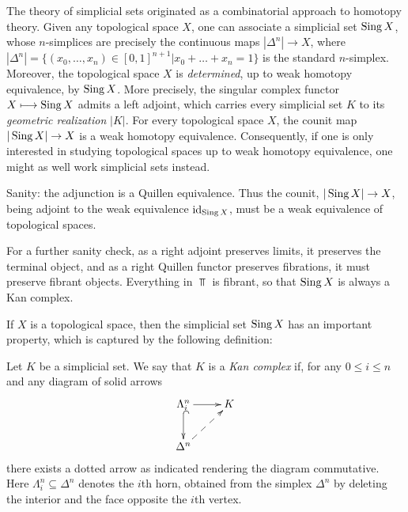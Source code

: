 The theory of simplicial sets originated as a combinatorial approach to homotopy theory. Given any topological space $X$, one can associate a simplicial set $\operatorname{Sing} X$, whose $n$-simplices are precisely the continuous maps $| \Delta^n | \rightarrow X$, where $|\Delta^n| = \{ (x_0, \ldots, x_n) \in [0,1]^{n+1} | x_0 + \ldots + x_n =1 \}$ is the standard $n$-simplex. Moreover, the topological space $X$ is {\em determined}, up to weak homotopy equivalence, by $\operatorname{Sing} X$. More precisely, the singular complex functor $X \longmapsto \operatorname{Sing} X$
admits a left adjoint, which carries every simplicial set $K$ to its {\it geometric realization} $|K|$. For every topological space $X$, the counit map  $| \operatorname{Sing} X | \rightarrow X$ is a weak homotopy equivalence. Consequently, if one is only interested in studying topological spaces up to weak homotopy equivalence, one might as well work simplicial sets instead.
\begin{shaded}
Sanity: the adjunction 
is a Quillen equivalence. Thus the counit, $| \operatorname{Sing} X | \rightarrow X$, being adjoint to the weak equivalence $\operatorname{id}_{\operatorname{Sing} X}$, must be a weak equivalence of topological spaces.

For a further sanity check, as a right adjoint preserves limits, it preserves the terminal object, and as a right Quillen functor preserves fibrations, it must preserve fibrant objects. Everything in $\Top$ is fibrant, so that $\operatorname{Sing} X$ is always a Kan complex.
\end{shaded}

If $X$ is a topological space, then the simplicial set $\operatorname{Sing} X$ has an important property, which is captured by the following definition:

\begin{definition}\label{strongkan}
Let $K$ be a simplicial set. We say that $K$ is a {\it Kan complex} if, for any $0 \leq i \leq n$ and any diagram of solid arrows
$$ \xymatrix{ \Lambda^n_i \ar[r] \ar@{^{(}->}[d] & K \\
\Delta^n \ar@{-->}[ur],& }$$
there exists a dotted arrow as indicated rendering the diagram commutative. Here $\Lambda^n_i \subseteq \Delta^n$ denotes the $i$th horn, obtained from the simplex $\Delta^n$ by deleting the interior and the face opposite the $i$th vertex.
\end{definition}

